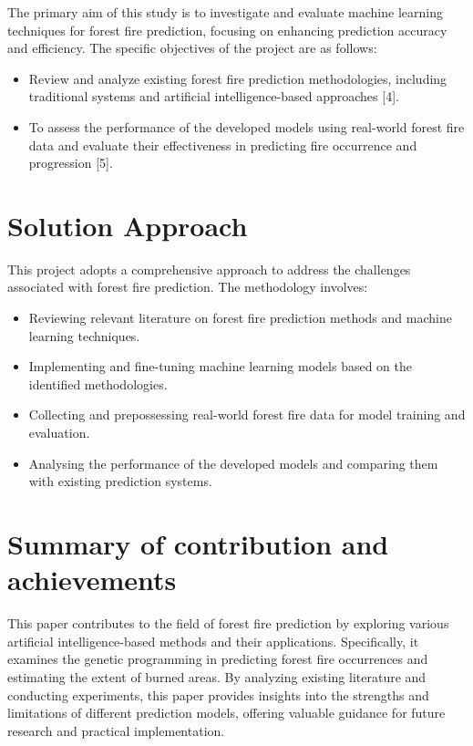 The primary aim of this study is to investigate and evaluate machine learning techniques for forest fire prediction, focusing on enhancing prediction accuracy and efficiency. The specific objectives of the project are as follows:
\begin{itemize}
     
    \item Review and analyze existing forest fire prediction methodologies, including traditional systems and artificial intelligence-based approaches [4].
    \item To assess the performance of the developed models using real-world forest fire data and evaluate their effectiveness in predicting fire occurrence and progression [5].

\end{itemize}


\section{Solution Approach}
\label{sec:into_back}
This project adopts a comprehensive approach to address the challenges associated with forest fire prediction. The methodology involves:
\begin{itemize}
    \item Reviewing relevant literature on forest fire prediction methods and machine learning techniques.
    \item Implementing and fine-tuning machine learning models based on the identified methodologies.
    \item Collecting and prepossessing real-world forest fire data for model training and evaluation.
    \item Analysing the performance of the developed models and comparing them with existing prediction systems.
\end{itemize}



\section{Summary of contribution and achievements}
\label{sec:into_back}
This paper contributes to the field of forest fire prediction by exploring various artificial intelligence-based methods and their applications. Specifically, it examines the genetic programming in predicting forest fire occurrences and estimating the extent of burned areas. By analyzing existing literature and conducting experiments, this paper provides insights into the strengths and limitations of different prediction models, offering valuable guidance for future research and practical implementation.


